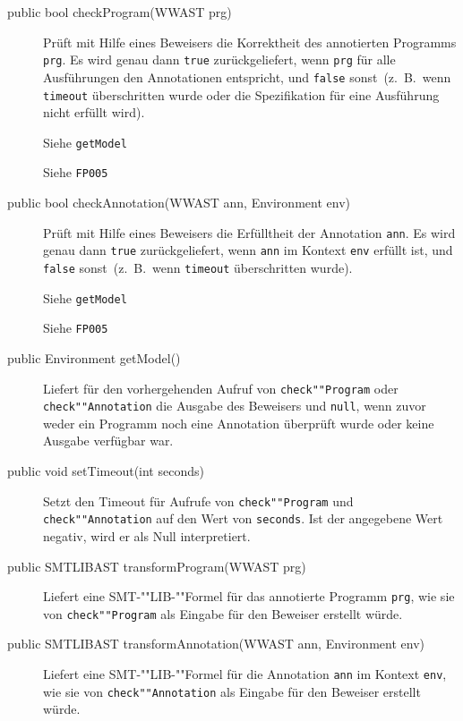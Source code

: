 
\begin{description}%
    \item[public bool checkProgram(WWAST prg)]

    Prüft mit Hilfe eines Beweisers die Korrektheit des annotierten
    Programms \texttt{prg}. Es wird genau dann \texttt{true}
    zurückgeliefert, wenn \texttt{prg} für alle Ausführungen den
    Annotationen entspricht, und \texttt{false} sonst~(z.~B.\, wenn
    \texttt{timeout} überschritten wurde oder die Spezifikation für
    eine Ausführung nicht erfüllt wird).%

    Siehe \texttt{getModel}%

    Siehe \texttt{FP005}%

    \item[public bool checkAnnotation(WWAST ann, Environment env)]

    Prüft mit Hilfe eines Beweisers die Erfülltheit der Annotation
    \texttt{ann}. Es wird genau dann \texttt{true} zurückgeliefert,
    wenn \texttt{ann} im Kontext \texttt{env} erfüllt ist, und
    \texttt{false} sonst~(z.~B.\, wenn \texttt{timeout} überschritten
    wurde).%

    Siehe \texttt{getModel}%

    Siehe \texttt{FP005}%

    \item[public Environment getModel()]

    Liefert für den vorhergehenden Aufruf von \texttt{check""Program}
    oder \texttt{check""Annotation} die Ausgabe des Beweisers und
    \texttt{null}, wenn zuvor weder ein Programm noch eine Annotation
    überprüft wurde oder keine Ausgabe verfügbar war.%

    \item[public void setTimeout(int seconds)]

    Setzt den Timeout für Aufrufe von \texttt{check""Program} und
    \texttt{check""Annotation} auf den Wert von \texttt{seconds}. Ist
    der angegebene Wert negativ, wird er als Null interpretiert.%

    \item[public SMTLIBAST transformProgram(WWAST prg)]

    Liefert eine SMT-""LIB-""Formel für das annotierte Programm
    \texttt{prg}, wie sie von \texttt{check""Program} als Eingabe für
    den Beweiser erstellt würde.%

    \item[public SMTLIBAST transformAnnotation(WWAST ann, Environment env)]

    Liefert eine SMT-""LIB-""Formel für die Annotation \texttt{ann} im
    Kontext \texttt{env}, wie sie von \texttt{check""Annotation} als
    Eingabe für den Beweiser erstellt würde.%

\end{description}%

